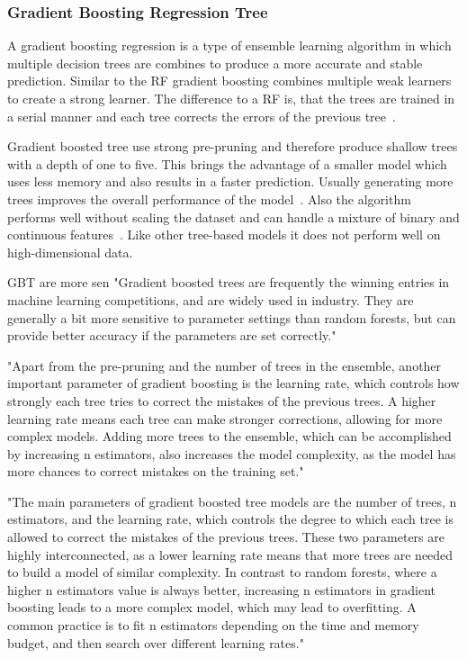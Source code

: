 \subsubsection{Gradient Boosting Regression Tree}
A gradient boosting regression is a type of ensemble learning algorithm in
which multiple decision trees are combines to produce a more accurate and stable
prediction.
Similar to the \ac{RF} gradient boosting combines multiple weak learners to create a
strong learner.
The difference to a \ac{RF} is, that the trees are trained in a serial manner and
each tree corrects the errors of the previous tree~\cite[p. 88--89]{
    muller_introductionmachinelearning_2016}.

Gradient boosted tree use strong pre-pruning and therefore produce shallow
trees with a depth of one to five.
This brings the advantage of a smaller model which uses less memory and also results in
a faster prediction.
Usually generating more trees improves the overall performance of the model~\cite[p.
88--89]{muller_introductionmachinelearning_2016}.
Also the algorithm performs well without scaling the dataset and can handle a mixture
of binary and continuous features~\cite[p. 88--89]{
    muller_introductionmachinelearning_2016}.
Like other tree-based models it does not perform well on high-dimensional data.

\ac{GBT} are more sen
"Gradient boosted trees are frequently the winning entries in machine
learning competitions, and are widely used in industry. They are
generally a bit more sensitive to parameter settings than random
forests, but can provide better accuracy if the parameters are set
correctly." \cite[p. 88-89]{muller_introductionmachinelearning_2016}

"Apart from the pre-pruning and the number of trees in the ensemble,
another important parameter of gradient boosting is the learning rate,
which controls how strongly each tree tries to correct the mistakes of
the previous trees. A higher learning rate means each tree can make
stronger corrections, allowing for more complex models. Adding more trees to
the ensemble, which
can be accomplished
by increasing
n estimators, also increases the model complexity, as the model has
more chances to correct mistakes on the training set." \cite[p.
88-89]{muller_introductionmachinelearning_2016}

"The main parameters of gradient boosted tree models are the number
of trees, n estimators, and the learning rate, which controls the degree to
which each tree is
allowed to correct the
mistakes of the previous trees.
These two parameters are highly interconnected, as a lower
learning rate means that more trees are needed to build a model of
similar complexity. In contrast to random forests, where a higher
n estimators value is always better, increasing n estimators in gradient
boosting leads to a more complex model, which may lead to overfitting. A
common practice is to fit n estimators depending on the time and
memory budget, and then search over different learning rates." \cite[p.
88-89]{muller_introductionmachinelearning_2016}


